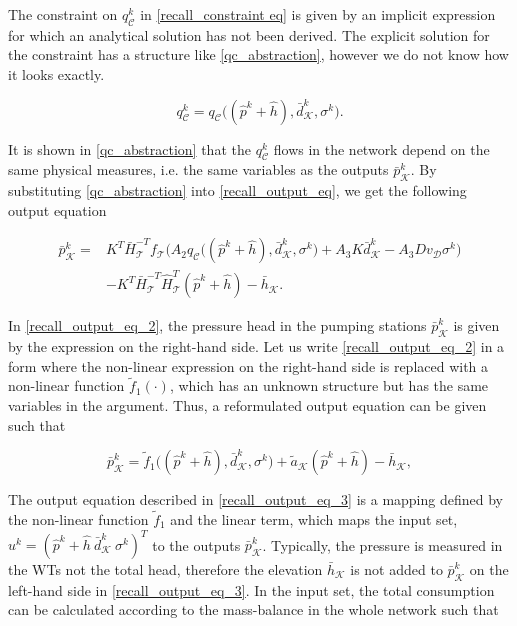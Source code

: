 The constraint on $q^{k}_{\mathcal{C}}$ in \eqref{recall_constraint eq} is given by an implicit expression for which an analytical solution has not been derived. The explicit solution for the constraint has a structure like \eqref{qc_abstraction}, however we do not know how it looks exactly.

 \begin{equation}
\label{qc_abstraction}
q^{k}_{\mathcal{C}} = q_{\mathcal{C}} \big( (\hat{p}^{k} + \hat{h}),\bar{d}^{k}_{\mathcal{K}}, \sigma^{k} \big).
\end{equation} 

It is shown in \eqref{qc_abstraction} that the $q^{k}_{\mathcal{C}}$ flows in the network depend on the same physical measures, i.e. the same variables as the outputs $\bar{p}^{k}_{\mathcal{K}}$. By substituting \eqref{qc_abstraction} into \eqref{recall_output_eq}, we get the following output equation

\vspace{-4mm}
\begin{align}
  \label{recall_output_eq_2}
      \bar{p}^{k}_{\mathcal{K}}  = & \nonumber K^T \bar{H}^{-T}_{\mathcal{T}}f_{\mathcal{T}} \big (A_2 q_{\mathcal{C}}\big ((\hat{p}^{k} + \hat{h}),\bar{d}^{k}_{\mathcal{K}}, \sigma^{k} \big) + A_3 K \bar{d}^{k}_{\mathcal{K}} - A_3 D v_{\mathcal{D}} \sigma^{k} \big)   \\ &  - K^T\bar{H}^{-T}_{\mathcal{T}}\hat{H}^{T}_{\mathcal{T}} (\hat{p}^{k} + \hat{h}) - \bar{h}_{\mathcal{K}} .
\end{align}

\vspace{-4mm}
In \eqref{recall_output_eq_2}, the pressure head in the pumping stations $\bar{p}^{k}_{\mathcal{K}}$ is given by the expression on the right-hand side. Let us write \eqref{recall_output_eq_2} in a form where the non-linear expression on the right-hand side is replaced with a non-linear function $\tilde{f}_1(\cdot)$, which has an unknown structure but has the same variables in the argument. Thus, a reformulated output equation can be given such that 

 \begin{equation}
  \label{recall_output_eq_3}
     \bar{p}^{k}_{\mathcal{K}}  = \tilde{f}_1 \big((\hat{p}^{k} + \hat{h}),\bar{d}^{k}_{\mathcal{K}}, \sigma^{k}\big) + \tilde{a}_{\mathcal{K}} (\hat{p}^{k} + \hat{h}) - \bar{h}_{\mathcal{K}}, 
\end{equation} 

The output equation described in \eqref{recall_output_eq_3} is a mapping defined by the non-linear function $\tilde{f}_1$ and the linear term, which maps the input set, $u^{k} = ( \hat{p}^{k}\!+\!\hat{h} \ \bar{d}^{k}_{\mathcal{K}} \ \sigma^{k} )^T$ to the outputs $\bar{p}^{k}_{\mathcal{K}}$. Typically, the pressure is measured in the WTs not the total head, therefore the elevation $\bar{h}_{\mathcal{K}}$ is not added to $\bar{p}^{k}_{\mathcal{K}}$ on the left-hand side in \eqref{recall_output_eq_3}. In the input set, the total consumption can be calculated according to the mass-balance in the whole network such that


